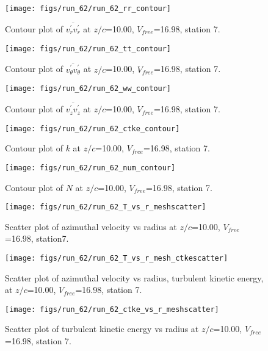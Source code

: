\begin{figure}[H]
\centering
\texttt{[image: figs/run\_62/run\_62\_rr\_contour]}
\caption{Contour plot of $\overline{v_{r}^{\prime} v_{r}^{\prime}}$ at $z/c$=10.00, $V_{free}$=16.98, station 7.}
\end{figure}


\begin{figure}[H]
\centering
\texttt{[image: figs/run\_62/run\_62\_tt\_contour]}
\caption{Contour plot of $\overline{v_{\theta}^{\prime} v_{\theta}^{\prime}}$ at $z/c$=10.00, $V_{free}$=16.98, station 7.}
\end{figure}


\begin{figure}[H]
\centering
\texttt{[image: figs/run\_62/run\_62\_ww\_contour]}
\caption{Contour plot of $\overline{v_{z}^{\prime} v_{z}^{\prime}}$ at $z/c$=10.00, $V_{free}$=16.98, station 7.}
\end{figure}


\begin{figure}[H]
\centering
\texttt{[image: figs/run\_62/run\_62\_ctke\_contour]}
\caption{Contour plot of $k$ at $z/c$=10.00, $V_{free}$=16.98, station 7.}
\end{figure}


\begin{figure}[H]
\centering
\texttt{[image: figs/run\_62/run\_62\_num\_contour]}
\caption{Contour plot of $N$ at $z/c$=10.00, $V_{free}$=16.98, station 7.}
\end{figure}


\begin{figure}[H]
\centering
\texttt{[image: figs/run\_62/run\_62\_T\_vs\_r\_meshscatter]}
\caption{Scatter plot of azimuthal velocity vs radius at $z/c$=10.00, $V_{free}$=16.98, station7.}
\end{figure}


\begin{figure}[H]
\centering
\texttt{[image: figs/run\_62/run\_62\_T\_vs\_r\_mesh\_ctkescatter]}
\caption{Scatter plot of azimuthal velocity vs radius, turbulent kinetic energy, at $z/c$=10.00, $V_{free}$=16.98, station 7.}
\end{figure}


\begin{figure}[H]
\centering
\texttt{[image: figs/run\_62/run\_62\_ctke\_vs\_r\_meshscatter]}
\caption{Scatter plot of turbulent kinetic energy vs radius at $z/c$=10.00, $V_{free}$=16.98, station 7.}
\end{figure}


